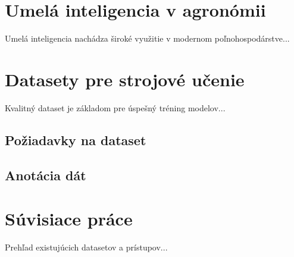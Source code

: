 \section{Umelá inteligencia v agronómii}

Umelá inteligencia nachádza široké využitie v modernom poľnohospodárstve...

\section{Datasety pre strojové učenie}

Kvalitný dataset je základom pre úspešný tréning modelov...

\subsection{Požiadavky na dataset}

\subsection{Anotácia dát}

\section{Súvisiace práce}

Prehľad existujúcich datasetov a prístupov...
